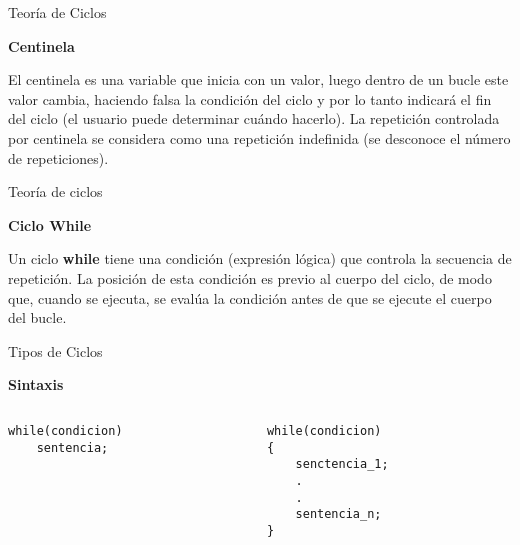 \begin{frame}{Teoría de Ciclos}
    \begin{center}\textbf{Centinela}\end{center}
    \hspace{5mm}
    El centinela es una variable que inicia con un valor, luego dentro de un bucle este valor cambia, haciendo falsa la condición del ciclo y por lo tanto indicará el fin del ciclo (el usuario puede determinar cuándo hacerlo). La repetición controlada por centinela se considera como una repetición indefinida (se desconoce el número de repeticiones).
\end{frame}



\begin{frame}{Teoría de ciclos}

    \begin{center}\textbf{Ciclo While}\end{center}
    \hspace{5mm}
    Un ciclo \textbf{while} tiene una condición (expresión lógica) que controla la secuencia de repetición. La posición de esta condición es previo al cuerpo del ciclo, de modo que, cuando se ejecuta, se evalúa la condición antes de que se ejecute el cuerpo del bucle.
\end{frame}


\begin{frame}[fragile]{Tipos de Ciclos}
\begin{center}\textbf{Sintaxis}\end{center}
\begin{columns}[t]
    \begin{column}{0.4 \textwidth}
        \begin{lstlisting}
while(condicion)
    sentencia;
\end{lstlisting}
    \end{column}
    \begin{column}{0.4 \textwidth}
        \begin{lstlisting}
while(condicion)
{
    senctencia_1;
    .
    .
    sentencia_n;
}
\end{lstlisting}
    \end{column}
\end{columns}
\end{frame}


